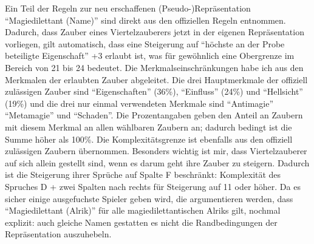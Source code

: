 Ein Teil der Regeln zur neu erschaffenen (Pseudo-)Repräsentation \enquote{Magiedilettant (Name)} sind direkt aus den offiziellen Regeln entnommen. Dadurch, dass Zauber eines Viertelzauberers jetzt in der eigenen Repräsentation vorliegen, gilt automatisch, dass eine Steigerung auf \enquote{höchste an der Probe beteiligte Eigenschaft} +3 erlaubt ist, was für gewöhnlich eine Obergrenze im Bereich von 21 bis 24 bedeutet. Die Merkmalseinschränkungen habe ich aus den Merkmalen der erlaubten Zauber abgeleitet. Die drei Hauptmerkmale der offiziell zulässigen Zauber sind \enquote{Eigenschaften} (36\%), \enquote{Einfluss} (24\%) und \enquote{Hellsicht} (19\%) und die drei nur einmal verwendeten Merkmale sind \enquote{Antimagie} \enquote{Metamagie} und \enquote{Schaden}. Die Prozentangaben geben den Anteil an Zaubern mit diesem Merkmal an allen wählbaren Zaubern an; dadurch bedingt ist die Summe höher als 100\%. Die Komplexitätsgrenze ist ebenfalls aus den offiziell zulässigen Zaubern übernommen. Besonders wichtig ist mir, dass Viertelzauberer auf sich allein gestellt sind, wenn es darum geht ihre Zauber zu steigern. Dadurch ist die Steigerung ihrer Sprüche auf Spalte F beschränkt: Komplexität des Spruches D + zwei Spalten nach rechts für Steigerung auf 11 oder höher. Da es sicher einige ausgefuchste Spieler geben wird, die argumentieren werden, dass \enquote{Magiedilettant (Alrik)} für alle magiedilettantischen Alriks gilt, nochmal explizit: auch gleiche Namen gestatten es nicht die Randbedingungen der Repräsentation auszuhebeln.

